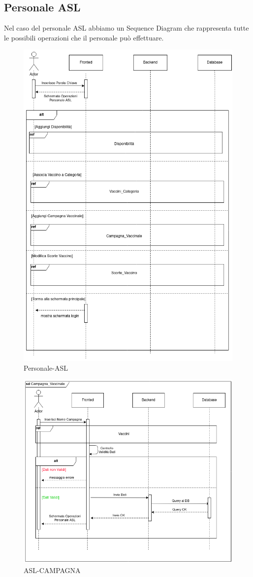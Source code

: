 \documentclass[a4paper,12pt,openany,oneside]{book}
\begin{document}
\subsection{Personale ASL}
Nel caso del personale ASL abbiamo un Sequence Diagram che rappresenta tutte le possibili operazioni che il personale può effettuare.
\begin{figure}[h] 
\centering
\includegraphics[width=0.8\columnwidth]{ASL-Personale-ASL.png} 
\caption{Personale-ASL} 
\end{figure}
\begin{figure}[h] 
\centering
\includegraphics[width=0.8\columnwidth]{ASL-CAMPAGNA.png} 
\caption{ASL-CAMPAGNA} 
\end{figure}
\end{document}
